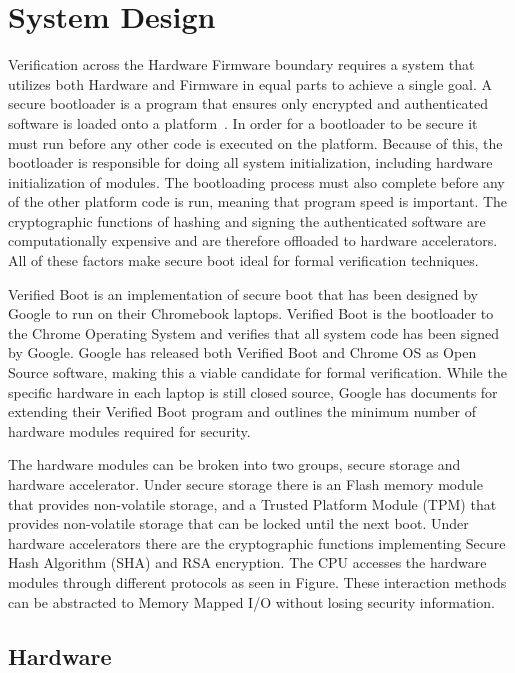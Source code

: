 \documentclass[../report.tex]{subfiles}
\begin{document}
\onehalfspacing

\section{System Design}

Verification across the Hardware Firmware boundary requires a system that utilizes both Hardware and Firmware in equal parts to achieve a single goal.
A secure bootloader is a program that ensures only encrypted and authenticated software is loaded onto a platform~\cite{secure-bootloader}.
In order for a bootloader to be secure it must run before any other code is executed on the platform.
Because of this, the bootloader is responsible for doing all system initialization, including hardware initialization of modules.
The bootloading process must also complete before any of the other platform code is run, meaning that program speed is important. 
The cryptographic functions of hashing and signing the authenticated software are computationally expensive and are therefore offloaded to hardware accelerators. 
All of these factors make secure boot ideal for formal verification techniques.

Verified Boot is an implementation of secure boot that has been designed by Google to run on their Chromebook laptops.
Verified Boot is the bootloader to the Chrome Operating System and verifies that all system code has been signed by Google.
Google has released both Verified Boot and Chrome OS as Open Source software, making this a viable candidate for formal verification.
While the specific hardware in each laptop is still closed source, Google has documents for extending their Verified Boot program and outlines the minimum
number of hardware modules required for security.

The hardware modules can be broken into two groups, secure storage and hardware accelerator.
Under secure storage there is an Flash memory module that provides non-volatile storage, and a Trusted Platform Module (TPM) that provides non-volatile storage that can be locked until the next boot.
Under hardware accelerators there are the cryptographic functions implementing Secure Hash Algorithm (SHA) and RSA encryption. 
The CPU accesses the hardware modules through different protocols as seen in Figure. %
These interaction methods can be abstracted to Memory Mapped I/O without losing security information.

\subsection{Hardware}
\end{document}
